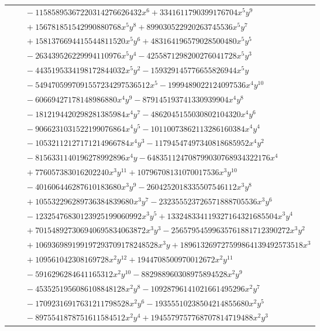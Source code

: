 \documentclass[11pt]{article}
\begin{document}
\begin{longtable}{@{}ll@{}}
 & $\quad -11585895367220314276626432x^{6}+3341611790399176704x^{5}y^{9}$\\
 & $\quad +156781851542990880768x^{5}y^{8}+899030522920263745536x^{5}y^{7}$\\
 & $\quad +1581376694415544811520x^{5}y^{6}+483164196579028500480x^{5}y^{5}$\\
 & $\quad -263439526229994110976x^{5}y^{4}-4255871298200276041728x^{5}y^{3}$\\
 & $\quad -4435195334198172844032x^{5}y^{2}-159329145776655826944x^{5}y$\\
 & $\quad -5494705997091557234297536512x^{5}-1999489022124097536x^{4}y^{10}$\\
 & $\quad -60669427178148986880x^{4}y^{9}-879145193741330939904x^{4}y^{8}$\\
 & $\quad -1812194420298281385984x^{4}y^{7}-4862045155030802104320x^{4}y^{6}$\\
 & $\quad -9066231031522199076864x^{4}y^{5}-10110073862113286160384x^{4}y^{4}$\\
 & $\quad -10532112127171214966784x^{4}y^{3}-11794547497340818685952x^{4}y^{2}$\\
 & $\quad -8156331140196278992896x^{4}y-648351124708799030768934322176x^{4}$\\
 & $\quad +776057383016202240x^{3}y^{11}+10796708131070017536x^{3}y^{10}$\\
 & $\quad -401606446287610183680x^{3}y^{9}-2604252018335507546112x^{3}y^{8}$\\
 & $\quad +105532296289736384839680x^{3}y^{7}-232355523726571888705536x^{3}y^{6}$\\
 & $\quad -12325476830123925199060992x^{3}y^{5}+133248334119327164321685504x^{3}y^{4}$\\
 & $\quad +701548927306940695834063872x^{3}y^{3}-25657954599635761881712390272x^{3}y^{2}$\\
 & $\quad +106936989199197293709178248528x^{3}y+189613269727599864139492573518x^{3}$\\
 & $\quad +109561042308169728x^{2}y^{12}+1944708500970012672x^{2}y^{11}$\\
 & $\quad -5916296284641165312x^{2}y^{10}-882988960308975894528x^{2}y^{9}$\\
 & $\quad -4535251956086108848128x^{2}y^{8}-10928796141021661495296x^{2}y^{7}$\\
 & $\quad -17092316917631211798528x^{2}y^{6}-19355510238504214855680x^{2}y^{5}$\\
 & $\quad -8975541878751611584512x^{2}y^{4}+1945579757768707814719488x^{2}y^{3}$\\

\end{longtable}
\end{document}
